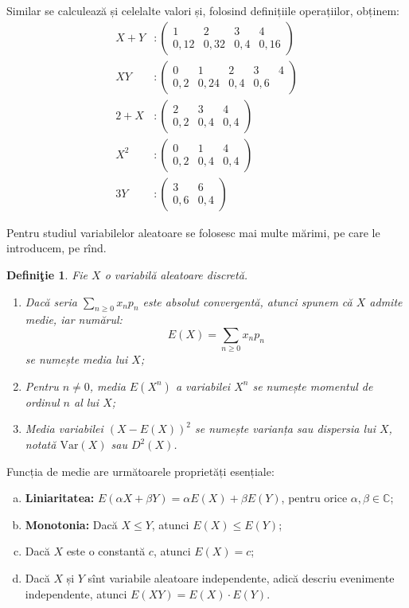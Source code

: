 \documentclass[12pt,a4paper]{article}
\newcommand\ds{\displaystyle}
\newcommand\CC{\mathbb{C}}
\theoremstyle{dotless}
\theoremstyle{dotlessdr}
\newtheorem{definition}{Defini\c{t}ie}
\begin{document}
Similar se calculează și celelalte valori și, folosind definițiile operațiilor,
obținem:
\begin{align*}
  X + Y &: \begin{pmatrix} 1 & 2 & 3 & 4 \\ 0,12 & 0,32 & 0,4 & 0,16 \end{pmatrix} \\
  XY &: \begin{pmatrix} 0 & 1 & 2 & 3 & 4 \\ 0,2 & 0,24 & 0,4 & 0,6 \end{pmatrix} \\
  2 + X &: \begin{pmatrix} 2 & 3 & 4 \\ 0,2 & 0,4 & 0,4 \end{pmatrix} \\
  X^2 &: \begin{pmatrix} 0 & 1 & 4 \\ 0,2 & 0,4 & 0,4 \end{pmatrix} \\
  3Y &: \begin{pmatrix} 3 & 6 \\ 0,6 & 0,4 \end{pmatrix}
\end{align*}

\vspace{1cm}


Pentru studiul variabilelor aleatoare se folosesc mai multe mărimi, pe care le introducem,
pe rînd.

\begin{definition}\label{def:medie-mom-var}
  Fie $ X $ o variabilă aleatoare discretă.
  \begin{enumerate}[(1)]
  \item Dacă seria $ \ds\sum_{n \geq 0} x_n p_n $ este absolut convergentă, atunci spunem că $ X $
    admite medie, iar numărul:
    \[
      E(X) = \sum_{n \geq 0} x_n p_n
    \]
    se numește \emph{media} lui $ X $;
  \item Pentru $ n \neq 0 $, media $ E(X^n) $ a variabilei $ X^n $ se numește \emph{momentul %
      de ordinul $ n $} al lui $ X $;
  \item Media variabilei $ (X - E(X))^2 $ se numește \emph{varianța} sau \emph{dispersia}
    lui $ X $, notată $ \mathrm{Var}(X) $ sau $ D^2(X) $.
  \end{enumerate}
\end{definition}

Funcția de medie are următoarele proprietăți esențiale:
\begin{enumerate}[(a)]
\item \textbf{Liniaritatea:} $ E(\alpha X + \beta Y) = \alpha E(X) + \beta E(Y) $, pentru
  orice $ \alpha, \beta \in \CC $;
\item \textbf{Monotonia:} Dacă $ X \leq Y $, atunci $ E(X) \leq E(Y) $;
\item Dacă $ X $ este o constantă $ c $, atunci $ E(X) = c $;
\item Dacă $ X $ și $ Y $ sînt variabile aleatoare independente, adică descriu evenimente
  independente, atunci $ E(XY) = E(X) \cdot E(Y) $.
\end{enumerate}
\end{document}
